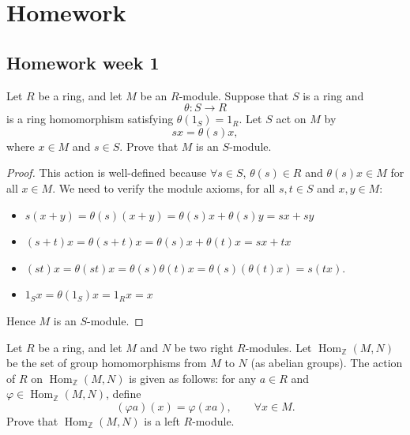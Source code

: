 \documentclass[11pt, a4paper]{report}
\begin{document}
\chapter{Homework}

\section{Homework week 1}

\begin{exercise}
    Let $R$ be a ring, and let $M$ be an $R$-module. Suppose that $S$ is a ring and
    \[
        \theta : S \to R
    \]
    is a ring homomorphism satisfying $\theta(1_S)=1_R$. Let $S$ act on $M$ by
    \[
        sx=\theta(s)x,
    \]
    where $x\in M$ and $s\in S$. Prove that $M$ is an $S$-module.
\end{exercise}

\begin{proof}
    This action is well-defined because $\forall s \in S$, $\theta(s) \in R$ and
    $\theta(s)x \in M$ for all $x \in M$. We need to verify the module axioms, for all
    $s, t \in S$ and $x, y \in M$:
    \begin{itemize}
        \item $s(x+y) = \theta(s)(x+y) = \theta(s)x + \theta(s)y = sx + sy$
        \item $(s+t)x = \theta(s+t)x = \theta(s)x + \theta(t)x = sx + tx$
        \item $(st)x=\theta(st)x=\theta(s)\theta(t)x=\theta(s)(\theta(t)x)=s(tx)$.
        \item $1_S x = \theta(1_S)x = 1_R x = x$
    \end{itemize}
    Hence $M$ is an $S$-module.
\end{proof}

\begin{exercise}
    Let $R$ be a ring, and let $M$ and $N$ be two right $R$-modules. Let
    $\operatorname{Hom}_{\mathbb{Z}}(M,N)$ be the set of group homomorphisms from $M$ to
    $N$ (as abelian groups). The action of $R$ on
    $\operatorname{Hom}_{\mathbb{Z}}(M,N)$ is given as follows: for any $a\in R$ and
    $\varphi\in \operatorname{Hom}_{\mathbb{Z}}(M,N)$, define
    \[
        (\varphi a)(x)=\varphi(xa), \qquad \forall x\in M.
    \]
    Prove that $\operatorname{Hom}_{\mathbb{Z}}(M,N)$ is a left $R$-module.
\end{exercise}
\end{document}
